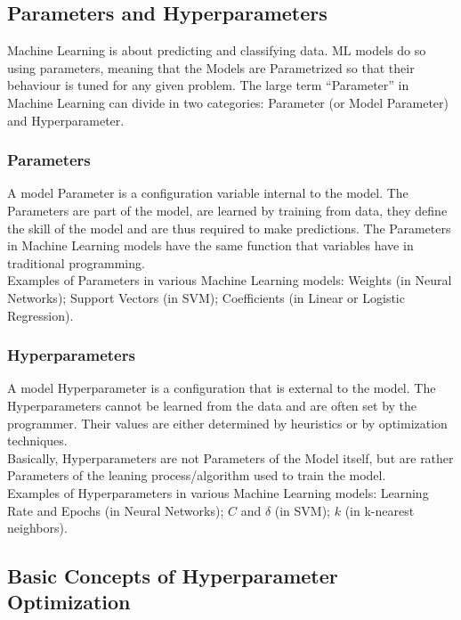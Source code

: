\subsection{Parameters and Hyperparameters}

Machine Learning is about predicting and classifying data. ML models do so using parameters, meaning that the Models are Parametrized so that their behaviour is tuned for any given problem.
The large term “Parameter” in Machine Learning can divide in two categories: Parameter (or Model Parameter) and Hyperparameter.

\subsubsection{Parameters}

A model Parameter is a configuration variable internal to the model.
The Parameters are part of the model, are learned by training from data, they define the skill of the model and are thus required to make predictions.
The Parameters in Machine Learning models have the same function that variables have in traditional programming.
\\[0.3cm]Examples of Parameters in various Machine Learning models: Weights (in Neural Networks); Support Vectors (in SVM); Coefficients (in Linear or Logistic Regression).

\subsubsection{Hyperparameters}

A model Hyperparameter is a configuration that is external to the model.
The Hyperparameters cannot be learned from the data and are often set by the programmer. Their values are either determined by heuristics or by optimization techniques.
\\[0.3cm]Basically, Hyperparameters are not Parameters of the Model itself, but are rather Parameters of the leaning process/algorithm used to train the model.
\\[0.3cm]Examples of Hyperparameters in various Machine Learning models: Learning Rate and Epochs (in Neural Networks); $C$ and $\delta$ (in SVM); $k$ (in k-nearest neighbors).

\subsection{Basic Concepts of Hyperparameter Optimization}

